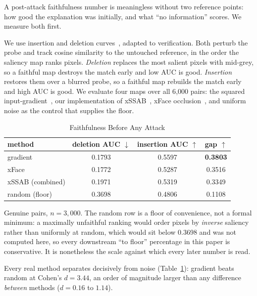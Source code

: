 \documentclass[conference,10pt]{IEEEtran}
\begin{document}
A post-attack faithfulness number is meaningless without two reference points: how good the
explanation was initially, and what ``no information'' scores. We measure both first.

We use insertion and deletion curves~\cite{petsiuk2018rise}, adapted to verification. Both
perturb the probe and track cosine similarity to the untouched reference, in the order the
saliency map ranks pixels. \emph{Deletion} replaces the most salient pixels with mid-grey, so
a faithful map destroys the match early and low AUC is good. \emph{Insertion} restores them
over a blurred probe, so a faithful map rebuilds the match early and high AUC is good. We
evaluate four maps over all 6{,}000 pairs: the squared
input-gradient~\cite{simonyan2014saliency}, our implementation of xSSAB~\cite{huber2024xssab},
xFace occlusion~\cite{knoche2023xface}, and uniform noise as the control that supplies the
floor.

\begin{table}[!t]
  \centering
  \caption{Faithfulness Before Any Attack}
  \label{tab:baseline}
  \begin{tabular}{lccc}
    \toprule
    method & deletion AUC $\downarrow$ & insertion AUC $\uparrow$ & gap $\uparrow$ \\
    \midrule
    gradient          & 0.1793 & 0.5597 & \textbf{0.3803} \\
    xFace             & 0.1772 & 0.5287 & 0.3516 \\
    xSSAB (combined)  & 0.1971 & 0.5319 & 0.3349 \\
    \midrule
    random (floor)    & 0.3698 & 0.4806 & 0.1108 \\
    \bottomrule
  \end{tabular}
  \vspace{2pt}
  \parbox{\columnwidth}{\footnotesize Genuine pairs, $n = 3{,}000$. The random row is a floor of
  convenience, not a formal minimum: a maximally unfaithful ranking would order pixels by
  \emph{inverse} saliency rather than uniformly at random, which would sit below 0.3698 and was
  not computed here, so every downstream ``to floor'' percentage in this paper is conservative.
  It is nonetheless the scale against which every later number is read.}
\end{table}

Every real method separates decisively from noise (Table~\ref{tab:baseline}): gradient beats
random at Cohen's $d = 3.44$, an order of magnitude larger than any difference \emph{between}
methods ($d = 0.16$ to $1.14$).
\end{document}
